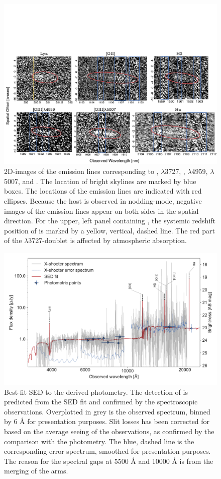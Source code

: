 \documentclass{aa}    %
\begin{document}
\begin{figure}
	\centering
	\includegraphics[width=18cm]{figures/grid.pdf}
	\caption{2D-images of the emission lines corresponding to \lya, \oii$\lambda$3727, \hb, \oiii$\lambda$4959, \oiii$\lambda$5007, and \ha. The location of bright skylines are marked by blue boxes. The locations of the emission lines are indicated with red ellipses. Because the host is observed in nodding-mode, negative images of the emission lines appear on both sides in the spatial direction. For the upper, left panel containing \lya, the systemic redshift position of \lya{} is marked by a yellow, vertical, dashed line. The red part of the \oii$\lambda$3727-doublet is affected by atmospheric absorption.}
	\label{fig:line}
\end{figure}


\begin{figure}
	\centering
	\includegraphics[width=16cm]{figures/SEDspecphot.pdf}
	\caption{Best-fit SED to the derived photometry. The detection of \lya{}  is predicted from the SED fit and confirmed by the spectroscopic observations. Overplotted in grey is the observed spectrum, binned by 6 \AA{} for presentation purposes. Slit losses has been corrected for based on the average seeing of the observations, as confirmed by the comparison with the photometry. The blue, dashed line is the corresponding error spectrum, smoothed for presentation purposes. The reason for the spectral gaps at 5500 \AA{} and 10000 \AA{} is from the merging of the arms.}
	\label{fig:SED}
\end{figure}
\end{document}

